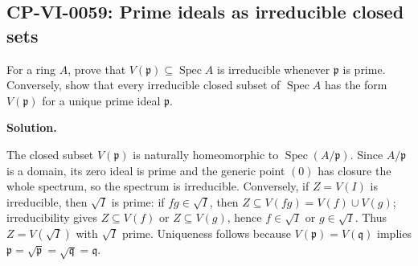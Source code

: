 
\subsection*{CP-VI-0059: Prime ideals as irreducible closed sets}

For a ring $A$, prove that $V(\mathfrak p)\subseteq\operatorname{Spec}A$ is irreducible whenever $\mathfrak p$ is prime. Conversely, show that every irreducible closed subset of $\operatorname{Spec}A$ has the form $V(\mathfrak p)$ for a unique prime ideal $\mathfrak p$.

\medskip
\noindent\textbf{Solution.}

The closed subset $V(\mathfrak p)$ is naturally homeomorphic to $\operatorname{Spec}(A/\mathfrak p)$. Since $A/\mathfrak p$ is a domain, its zero ideal is prime and the generic point $(0)$ has closure the whole spectrum, so the spectrum is irreducible. Conversely, if $Z=V(I)$ is irreducible, then $\sqrt I$ is prime: if $fg\in\sqrt I$, then $Z\subseteq V(fg)=V(f)\cup V(g)$; irreducibility gives $Z\subseteq V(f)$ or $Z\subseteq V(g)$, hence $f\in\sqrt I$ or $g\in\sqrt I$. Thus $Z=V(\sqrt I)$ with $\sqrt I$ prime. Uniqueness follows because $V(\mathfrak p)=V(\mathfrak q)$ implies $\mathfrak p=\sqrt{\mathfrak p}=\sqrt{\mathfrak q}=\mathfrak q$.
